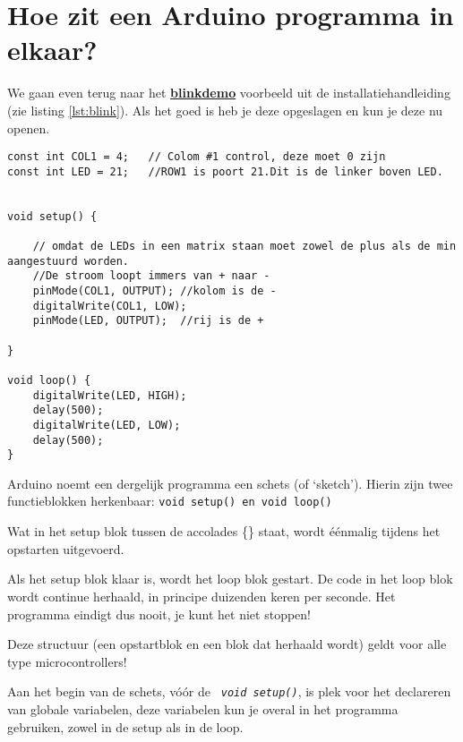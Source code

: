 \section{ Hoe zit een Arduino programma in elkaar?}\label{sec:blink}

We gaan even terug naar het  \href{https://github.com/JohnVi-hhs/embsysP/tree/main/voorbeelden/blink.ino}{  \textbf{blinkdemo}} voorbeeld uit de installatiehandleiding (zie listing \ref{lst:blink}).  Als het goed is heb je deze opgeslagen en kun je deze nu openen.

	


\begin{lstlisting}[caption= Het programma blinkdemo,label={lst:blink},firstnumber=1]		
const int COL1 = 4;   // Colom #1 control, deze moet 0 zijn
const int LED = 21;   //ROW1 is poort 21.Dit is de linker boven LED.


void setup() {
	
	// omdat de LEDs in een matrix staan moet zowel de plus als de min aangestuurd worden.
	//De stroom loopt immers van + naar -
	pinMode(COL1, OUTPUT); //kolom is de -
	digitalWrite(COL1, LOW);
	pinMode(LED, OUTPUT);  //rij is de +
	
}

void loop() {
	digitalWrite(LED, HIGH);
	delay(500);
	digitalWrite(LED, LOW);
	delay(500);
}
\end{lstlisting}

Arduino noemt een dergelijk programma een schets (of ‘sketch’). 
Hierin zijn twee functieblokken herkenbaar: \texttt{{\textcolor{arduinoBlue}{void}} \textcolor{arduinoGreen}{setup}(){} en  \textcolor{arduinoBlue}{void} \textcolor{arduinoGreen}{loop}(){}}

Wat in het setup blok tussen de accolades \{\} staat, wordt éénmalig tijdens het opstarten uitgevoerd.

Als het setup blok klaar is, wordt het loop blok gestart. De code in het loop blok wordt continue herhaald, in principe duizenden keren per seconde. Het programma eindigt dus nooit, je kunt het niet stoppen!

Deze structuur (een opstartblok en een blok dat herhaald wordt) geldt voor alle type microcontrollers!

Aan het begin van de schets, vóór de \texttt{\textit{ \textcolor{arduinoBlue}{void} \textcolor{arduinoGreen}{setup}()}}, is plek voor het declareren van globale variabelen, deze variabelen kun je overal in het programma gebruiken, zowel in de setup als in de loop.

